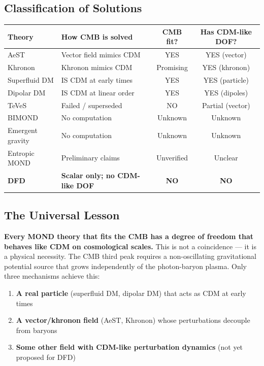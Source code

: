 \documentclass[11pt,a4paper]{article}
\begin{document}
\subsection{Classification of Solutions}

\begin{center}
\begin{tabular}{llcc}
\toprule
\textbf{Theory} & \textbf{How CMB is solved} & \textbf{CMB fit?} & \textbf{Has CDM-like DOF?} \\
\midrule
AeST & Vector field mimics CDM & YES & YES (vector) \\
Khronon & Khronon mimics CDM & Promising & YES (khronon) \\
Superfluid DM & IS CDM at early times & YES & YES (particle) \\
Dipolar DM & IS CDM at linear order & YES & YES (dipoles) \\
TeVeS & Failed / superseded & NO & Partial (vector) \\
BIMOND & No computation & Unknown & Unknown \\
Emergent gravity & No computation & Unknown & Unknown \\
Entropic MOND & Preliminary claims & Unverified & Unclear \\
\textbf{DFD} & \textbf{Scalar only; no CDM-like DOF} & \textbf{NO} & \textbf{NO} \\
\bottomrule
\end{tabular}
\end{center}

\subsection{The Universal Lesson}

\textbf{Every MOND theory that fits the CMB has a degree of freedom that behaves like CDM on cosmological scales.} This is not a coincidence --- it is a physical necessity. The CMB third peak requires a non-oscillating gravitational potential source that grows independently of the photon-baryon plasma. Only three mechanisms achieve this:

\begin{enumerate}
\item \textbf{A real particle} (superfluid DM, dipolar DM) that acts as CDM at early times
\item \textbf{A vector/khronon field} (AeST, Khronon) whose perturbations decouple from baryons
\item \textbf{Some other field with CDM-like perturbation dynamics} (not yet proposed for DFD)
\end{enumerate}
\end{document}
